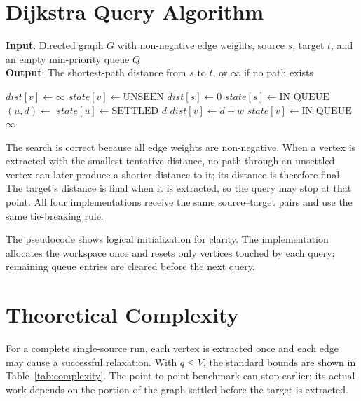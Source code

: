 \documentclass[12pt,a4paper]{report}
\begin{document}
\section{Dijkstra Query Algorithm}
\noindent\textbf{Input}: Directed graph $G$ with non-negative edge weights,
source $s$, target $t$, and an empty min-priority queue $Q$\\
\textbf{Output}: The shortest-path distance from $s$ to $t$, or $\infty$ if
no path exists

\begin{algorithm}[H]
  \begin{algorithmic}[1]
      \State $dist[v] \gets \infty$
      \State $state[v] \gets \text{UNSEEN}$
    \EndFor
    \State $dist[s] \gets 0$
    \State {}
    \State $state[s] \gets \text{IN\_QUEUE}$
      \State $(u,d) \gets$ 
      \State $state[u] \gets \text{SETTLED}$
        \State \Return $d$
      \EndIf
          \State $dist[v] \gets d+w$
            \State {}
            \State $state[v] \gets \text{IN\_QUEUE}$
          \Else
            \State {}
          \EndIf
        \EndIf
      \EndFor
    \EndWhile
    \State \Return $\infty$
  \end{algorithmic}
  \caption{Point-to-point Dijkstra query with early termination}
  \label{alg:dijkstra-query}
\end{algorithm}

The search is correct because all edge weights are non-negative. When a
vertex is extracted with the smallest tentative distance, no path through an
unsettled vertex can later produce a shorter distance to it; its distance is
therefore final. The target's distance is final when it is extracted, so the
query may stop at that point. All four implementations receive the same
source--target pairs and use the same tie-breaking rule.

The pseudocode shows logical initialization for clarity. The implementation
allocates the workspace once and resets only vertices touched by each query;
remaining queue entries are cleared before the next query.

\section{Theoretical Complexity}
For a complete single-source run, each vertex is extracted once and each edge
may cause a successful relaxation. With $q\leq V$, the standard bounds are
shown in Table~\ref{tab:complexity}. The point-to-point benchmark can stop
earlier; its actual work depends on the portion of the graph settled before
the target is extracted.
\end{document}
